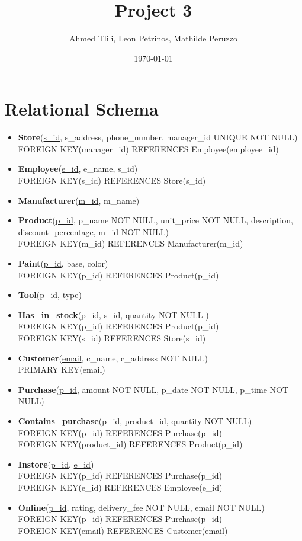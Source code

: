\documentclass[a4paper,11pt]{article}
\title{Project 3}
\author{Ahmed Tlili, Leon Petrinos, Mathilde Peruzzo}
\date{\today}
\begin{document}
\maketitle

\section*{Relational Schema}
\begin{itemize}
    \item \textbf{Store}(\underline{s\_id}, s\_address, phone\_number, manager\_id UNIQUE NOT NULL)\\
        FOREIGN KEY(manager\_id) REFERENCES Employee(employee\_id)
    \item \textbf{Employee}(\underline{e\_id}, e\_name, s\_id)\\
        FOREIGN KEY(s\_id) REFERENCES Store(s\_id)
    \item \textbf{Manufacturer}(\underline{m\_id}, m\_name)
    \item \textbf{Product}(\underline{p\_id}, p\_name NOT NULL, unit\_price NOT NULL, description,\\ discount\_percentage, m\_id NOT NULL)\\
        FOREIGN KEY(m\_id) REFERENCES Manufacturer(m\_id)
    \item \textbf{Paint}(\underline{p\_id}, base, color)\\
        FOREIGN KEY(p\_id) REFERENCES Product(p\_id)
    \item \textbf{Tool}(\underline{p\_id}, type)
    \item \textbf{Has\_in\_stock}(\underline{p\_id}, \underline{s\_id}, quantity NOT NULL )\\
        FOREIGN KEY(p\_id) REFERENCES Product(p\_id)\\
        FOREIGN KEY(s\_id) REFERENCES Store(s\_id)
    \item \textbf{Customer}(\underline{email}, c\_name, c\_address NOT NULL)\\
        PRIMARY KEY(email)
    \item \textbf{Purchase}(\underline{p\_id}, amount NOT NULL, p\_date NOT NULL, p\_time NOT NULL)
    \item \textbf{Contains\_purchase}(\underline{p\_id}, \underline{product\_id}, quantity NOT NULL)\\
        FOREIGN KEY(p\_id) REFERENCES Purchase(p\_id)\\
        FOREIGN KEY(product\_id) REFERENCES Product(p\_id)
    \item \textbf{Instore}(\underline{p\_id}, \underline{e\_id})\\
        FOREIGN KEY(p\_id) REFERENCES Purchase(p\_id)\\
        FOREIGN KEY(e\_id) REFERENCES Employee(e\_id)
    \item \textbf{Online}(\underline{p\_id}, rating, delivery\_fee NOT NULL, email NOT NULL)\\
        FOREIGN KEY(p\_id) REFERENCES Purchase(p\_id)\\
        FOREIGN KEY(email) REFERENCES Customer(email)
\end{itemize}
\end{document}
